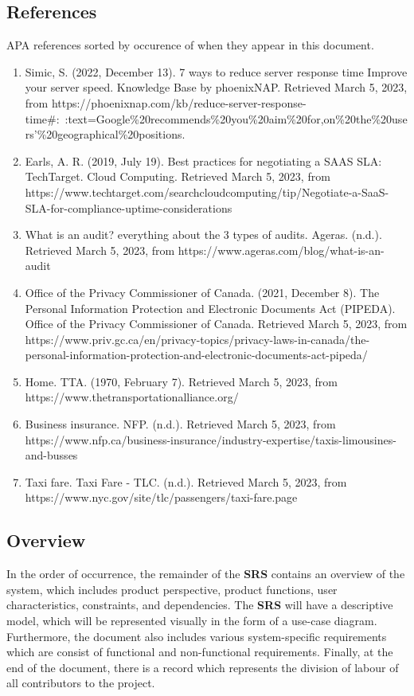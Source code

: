 \documentclass[]{article}
\begin{document}
\subsection{References}
\label{sub:references}
APA references sorted by occurence of when they appear in this document.
\begin{enumerate}
	\item Simic, S. (2022, December 13). 7 ways to reduce server response time {Improve your server speed}. Knowledge Base by phoenixNAP. Retrieved March 5, 2023, from https://phoenixnap.com/kb/reduce-server-response-time\#:~:text=Google\%20recommends\%20you\%20aim\%20for,on\%20the\%20users'\%20geographical\%20positions.
	\item Earls, A. R. (2019, July 19). Best practices for negotiating a SAAS SLA: TechTarget. Cloud Computing. Retrieved March 5, 2023, from https://www.techtarget.com/searchcloudcomputing/tip/Negotiate-a-SaaS-SLA-for-compliance-uptime-considerations
	\item What is an audit? everything about the 3 types of audits. Ageras. (n.d.). Retrieved March 5, 2023, from https://www.ageras.com/blog/what-is-an-audit
	\item Office of the Privacy Commissioner of Canada. (2021, December 8). The Personal Information Protection and Electronic Documents Act (PIPEDA). Office of the Privacy Commissioner of Canada. Retrieved March 5, 2023, from https://www.priv.gc.ca/en/privacy-topics/privacy-laws-in-canada/the-personal-information-protection-and-electronic-documents-act-pipeda/
	\item Home. TTA. (1970, February 7). Retrieved March 5, 2023, from https://www.thetransportationalliance.org/
	\item Business insurance. NFP. (n.d.). Retrieved March 5, 2023, from https://www.nfp.ca/business-insurance/industry-expertise/taxis-limousines-and-busses
	\item Taxi fare. Taxi Fare - TLC. (n.d.). Retrieved March 5, 2023, from https://www.nyc.gov/site/tlc/passengers/taxi-fare.page
\end{enumerate}

\subsection{Overview}
\label{sub:overview}
In the order of occurrence, the remainder of the \textbf{SRS} contains an overview of the system, which includes product perspective, product functions, user characteristics, constraints, and dependencies. The \textbf{SRS} will have a descriptive model, which will be represented visually in the form of a use-case diagram. Furthermore, the document also includes various system-specific requirements which are consist of functional and non-functional requirements.  Finally, at the end of the document, there is a record which represents the division of labour of all contributors to the project.
\end{document}
